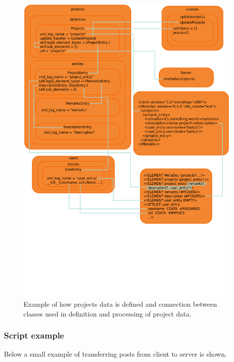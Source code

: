 \begin{figure}[h!]
    \includegraphics[width=\textwidth]{img/example}
    \caption{Example of how projects data is defined and connection between
    classes used in definition and processing of project data.}
    \label{fig:connection_example}
\end{figure}

\subsubsection{Script example}
Below a small example of transferring posts from client to server is shown. 

